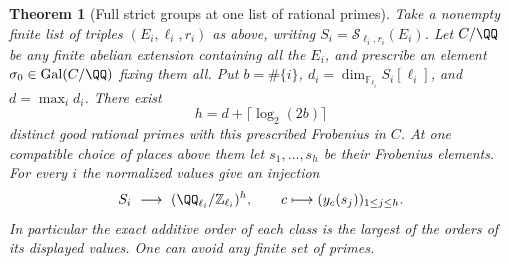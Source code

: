 \documentclass[a4paper,11pt]{article}
\newtheorem{theorem}[proposition]{Theorem}
\theoremstyle{definition}
\theoremstyle{remark}
\newcommand{\ZZ}{\mathbb Z}\newcommand{\ord}{\operatorname{ord}}
\numberwithin{equation}{section}
\begin{document}
\begin{theorem}[Full strict groups at one list of rational primes]
\leavevmode\label{thm:normalizedprimes600}
Take a nonempty finite list of triples \((E_i,\ell_i,r_i)\)
as above, writing \(S_i=\mathcal S_{\ell_i,r_i}(E_i)\).
Let \(C/\QQ\) be any finite abelian extension containing
all the \(E_i\), and prescribe an element
\(\sigma_0\in\operatorname{Gal}(C/\QQ)\) fixing them
all. Put \(b=\#\{i\}\), \(d_i=\dim_{\mathbb F_{\ell_i}}
S_i[\ell_i]\), and \(d=\max_i d_i\). There exist
\[
               h=d+\lceil\log_2(2b)\rceil
\]
distinct good rational primes with this prescribed
Frobenius in \(C\). At one compatible choice of places
above them let \(s_1,\ldots,s_h\) be their Frobenius
elements. For every \(i\) the normalized values give
an injection
\[
       S_i\ \longrightarrow\
        (\QQ_{\ell_i}/\ZZ_{\ell_i})^h,\qquad
             c\longmapsto (y_c(s_j))_{1\le j\le h}.
\]
In particular the exact additive order of each class
is the largest of the orders of its displayed values.
One can avoid any finite set of primes.
\end{theorem}
\end{document}
